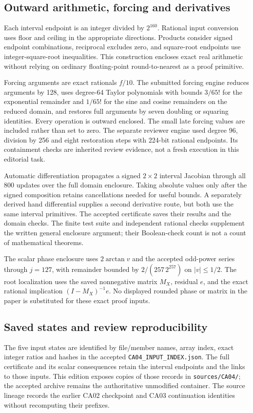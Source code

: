 \documentclass[11pt,a4paper]{article}
\numberwithin{equation}{section}
\begin{document}
\subsection{Outward arithmetic, forcing and derivatives}
Each interval endpoint is an integer divided by $2^{160}$. Rational input conversion uses floor and ceiling in the appropriate directions. Products consider signed endpoint combinations, reciprocal excludes zero, and square-root endpoints use integer-square-root inequalities. This construction encloses exact real arithmetic without relying on ordinary floating-point round-to-nearest as a proof primitive.

Forcing arguments are exact rationals $f/10$. The submitted forcing engine reduces arguments by 128, uses degree-64 Taylor polynomials with bounds $3/65!$ for the exponential remainder and $1/65!$ for the sine and cosine remainders on the reduced domain, and restores full arguments by seven doubling or squaring identities. Every operation is outward enclosed. The small late forcing values are included rather than set to zero. The separate reviewer engine used degree 96, division by 256 and eight restoration steps with 224-bit rational endpoints. Its containment checks are inherited review evidence, not a fresh execution in this editorial task.

Automatic differentiation propagates a signed $2\times2$ interval Jacobian through all 800 updates over the full domain enclosure. Taking absolute values only after the signed composition retains cancellations needed for useful bounds. A separately derived hand differential supplies a second derivative route, but both use the same interval primitives. The accepted certificate saves their results and the domain checks. The finite test suite and independent rational checks supplement the written general enclosure argument; their Boolean-check count is not a count of mathematical theorems.

The scalar phase enclosure uses $2\arctan v$ and the accepted odd-power series through $j=127$, with remainder bounded by $2/(257\,2^{257})$ on $|v|\le1/2$. The root localization uses the saved nonnegative matrix $M_X$, residual $e$, and the exact rational implication $(I-M_X)^{-1}e$. No displayed rounded phase or matrix in the paper is substituted for these exact proof inputs.

\subsection{Saved states and review reproducibility}
The five input states are identified by file/member names, array index, exact integer ratios and hashes in the accepted \texttt{CA04\_INPUT\_INDEX.json}. The full certificate and its scalar consequences retain the interval endpoints and the links to those inputs. This edition exposes copies of those records in \texttt{sources/CA04/}; the accepted archive remains the authoritative unmodified container. The source lineage records the earlier CA02 checkpoint and CA03 continuation identities without recomputing their prefixes.
\end{document}
